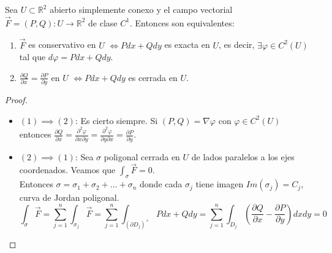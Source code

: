 

\begin{corolario}
    Sea $U \subset \mathbb{R}^2$ abierto simplemente conexo y el campo vectorial $\vec{F} = (P, Q): U \to \mathbb{R}^2$ de clase $C^1$. Entonces son equivalentes:
    \begin{enumerate}
        \item $\vec{F}$ es conservativo en $U$ $\iff Pdx + Qdy$ es exacta en $U$, es decir, $\exists \varphi \in C^2(U)$ tal que $d\varphi = Pdx + Qdy$.
        \item $\frac{\partial Q}{\partial x} = \frac{\partial P}{\partial y}$ en $U$ $\iff Pdx + Qdy$ es cerrada en $U$.
    \end{enumerate}
\end{corolario}

\begin{proof}
    \leavevmode
    \begin{itemize}
        \item $(1) \implies (2)$: Es cierto siempre. Si $(P, Q) = \nabla \varphi$ con $\varphi \in C^2(U)$ entonces $\frac{\partial Q}{\partial x} = \frac{\partial ^2 \varphi}{\partial x \partial y} = \frac{\partial ^2 \varphi}{\partial y \partial x} = \frac{\partial P}{\partial y}$.
        \item $(2) \implies (1)$: Sea $\sigma$ poligonal cerrada en $U$ de lados paralelos a los ejes coordenados. Veamos que $\int_{\sigma} \vec{F} = 0$.\\
              Entonces $\sigma = \sigma_1 + \sigma_2 + \ldots + \sigma_n$ donde cada $\sigma_j$ tiene imagen $Im(\sigma_j) = C_j$, curva de Jordan poligonal.
              $$  \int_{\sigma} \vec{F} = \sum_{j=1}^{n} \int_{\sigma_j} \vec{F} = \sum_{j=1}^{n} \int_{(\partial D_j)^+} Pdx + Qdy = \sum_{j=1}^{n} \int_{D_j} \left( \frac{\partial Q}{\partial x} - \frac{\partial P}{\partial y} \right) dx dy = 0$$

    \end{itemize}
\end{proof}


